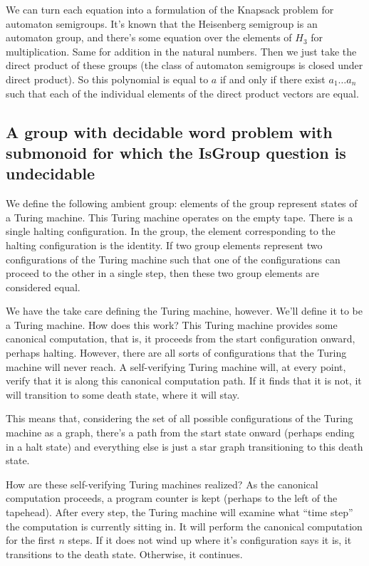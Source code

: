 \documentclass[11pt]{article}
\begin{document}
We can turn each equation into a formulation of the Knapsack problem
for automaton semigroups. It's known that the Heisenberg semigroup is
an automaton group, and there's some equation over the elements of
$H_3$ for multiplication. Same for addition in the natural
numbers. Then we just take the direct product of these groups (the
class of automaton semigroups is closed under direct product). So this
polynomial is equal to $a$ if and only if there exist $a_1 \ldots a_n$
such that each of the individual elements of the direct product
vectors are equal.

\subsection{A group with decidable word problem with submonoid for
  which the IsGroup question is undecidable}


We define the following ambient group: elements of the group represent
states of a Turing machine. This Turing machine operates on the empty
tape. There is a single halting configuration. In the group, the
element corresponding to the halting configuration is the identity. If
two group elements represent two configurations of the Turing machine
such that one of the configurations can proceed to the other in a
single step, then these two group elements are considered equal.

We have the take care defining the Turing machine, however. We'll
define it to be a  Turing machine. How does this
work? This Turing machine provides some canonical computation, that
is, it proceeds from the start configuration onward, perhaps
halting. However, there are all sorts of configurations that the
Turing machine will never reach. A self-verifying Turing machine will,
at every point, verify that it is along this canonical computation
path. If it finds that it is not, it will transition to some death
state, where it will stay.

This means that, considering the set of all possible configurations of
the Turing machine as a graph, there's a path from the start state
onward (perhaps ending in a halt state) and everything else is just a
star graph transitioning to this death state.

How are these self-verifying Turing machines realized? As the
canonical computation proceeds, a program counter is kept (perhaps to
the left of the tapehead). After every step, the Turing machine will
examine what ``time step'' the computation is currently sitting in. It
will perform the canonical computation for the first $n$ steps. If it
does not wind up where it's configuration says it is, it transitions
to the death state. Otherwise, it continues.
\end{document}
